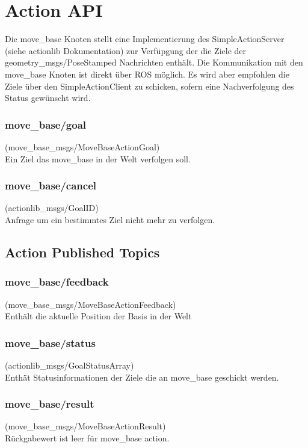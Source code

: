 \documentclass[oribibl]{llncs}
\begin{document}
\section{Action API}
Die move\_base Knoten stellt eine Implementierung des SimpleActionServer (siehe actionlib Dokumentation) zur Verfüpgung der die Ziele der geometry\_msgs/PoseStamped Nachrichten enthält. Die Kommunikation mit den move\_base Knoten ist direkt über ROS möglich. Es wird aber empfohlen die Ziele über den SimpleActionClient zu schicken, sofern eine Nachverfolgung des Status gewünscht wird.
\subsubsection{move\_base/goal} (move\_base\_msgs/MoveBaseActionGoal)\\
	Ein Ziel das move\_base in der Welt verfolgen soll.
\subsubsection{move\_base/cancel} (actionlib\_msgs/GoalID)\\
	Anfrage um ein bestimmtes Ziel nicht mehr zu verfolgen.
\subsection{Action Published Topics}
\subsubsection{move\_base/feedback} (move\_base\_msgs/MoveBaseActionFeedback)\\
	Enthält die aktuelle Position der Basis in der Welt
\subsubsection{move\_base/status} (actionlib\_msgs/GoalStatusArray)\\
	Enthät Statusinformationen der Ziele die an move\_base geschickt werden.
\subsubsection{move\_base/result} (move\_base\_msgs/MoveBaseActionResult)\\
	Rückgabewert ist leer für move\_base action.
\end{document}
